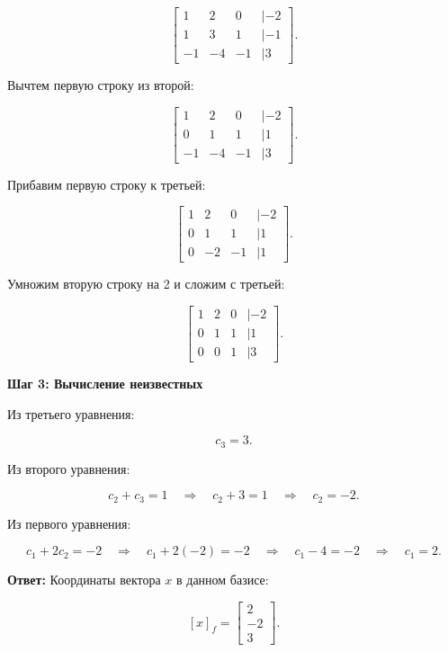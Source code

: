 \[
\begin{bmatrix}
1 & 2 & 0 & | -2 \\
1 & 3 & 1 & | -1 \\
-1 & -4 & -1 & | 3
\end{bmatrix}.
\]

Вычтем первую строку из второй:

\[
\begin{bmatrix}
1 & 2 & 0 & | -2 \\
0 & 1 & 1 & | 1 \\
-1 & -4 & -1 & | 3
\end{bmatrix}.
\]

Прибавим первую строку к третьей:

\[
\begin{bmatrix}
1 & 2 & 0 & | -2 \\
0 & 1 & 1 & | 1 \\
0 & -2 & -1 & | 1
\end{bmatrix}.
\]

Умножим вторую строку на 2 и сложим с третьей:

\[
\begin{bmatrix}
1 & 2 & 0 & | -2 \\
0 & 1 & 1 & | 1 \\
0 & 0 & 1 & | 3
\end{bmatrix}.
\]

\textbf{Шаг 3: Вычисление неизвестных}  

Из третьего уравнения:

\[
c_3 = 3.
\]

Из второго уравнения:

\[
c_2 + c_3 = 1 \quad \Rightarrow \quad c_2 + 3 = 1 \quad \Rightarrow \quad c_2 = -2.
\]

Из первого уравнения:

\[
c_1 + 2c_2 = -2 \quad \Rightarrow \quad c_1 + 2(-2) = -2 \quad \Rightarrow \quad c_1 - 4 = -2 \quad \Rightarrow \quad c_1 = 2.
\]

\textbf{Ответ:}  
Координаты вектора \( x \) в данном базисе:

\[
[x]_f = \begin{bmatrix} 2 \\ -2 \\ 3 \end{bmatrix}.
\]
